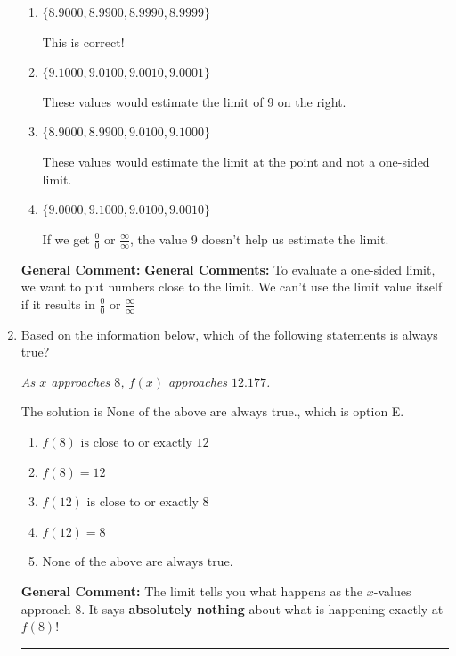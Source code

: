 \documentclass{extbook}[14pt]
\newcommand{\litem}[1]{\item #1

\rule{\textwidth}{0.4pt}}
\begin{document}
\begin{enumerate}
{\begin{enumerate}[label=\Alph*.]
If we get $\frac{0}{0}$ or $\frac{\infty}{\infty}$, the value 9 doesn't help us estimate the limit.
\item \( \{ 8.9000, 8.9900, 8.9990, 8.9999 \} \)

This is correct!
\item \( \{ 9.1000, 9.0100, 9.0010, 9.0001 \} \)

These values would estimate the limit of 9 on the right.
\item \( \{ 8.9000, 8.9900, 9.0100, 9.1000 \} \)

These values would estimate the limit at the point and not a one-sided limit.
\item \( \{ 9.0000, 9.1000, 9.0100, 9.0010 \} \)

If we get $\frac{0}{0}$ or $\frac{\infty}{\infty}$, the value 9 doesn't help us estimate the limit.
\end{enumerate}

\textbf{General Comment:} \textbf{General Comments:} To evaluate a one-sided limit, we want to put numbers close to the limit. We can't use the limit value itself if it results in $\frac{0}{0}$ or $\frac{\infty}{\infty}$
}
\litem{
Based on the information below, which of the following statements is always true?

\begin{center}
    \textit{ As $x$ approaches $8$, $f(x)$ approaches $12.177$. }
\end{center}
The solution is \( \text{None of the above are always true.} \), which is option E.\begin{enumerate}[label=\Alph*.]
\item \( f(8) \text{ is close to or exactly } 12 \)


\item \( f(8) = 12 \)


\item \( f(12) \text{ is close to or exactly } 8 \)


\item \( f(12) = 8 \)


\item \( \text{None of the above are always true.} \)


\end{enumerate}

\textbf{General Comment:} The limit tells you what happens as the $x$-values approach $8$. It says \textbf{absolutely nothing} about what is happening exactly at $f(8)$!
}
\end{enumerate}
\end{document}
